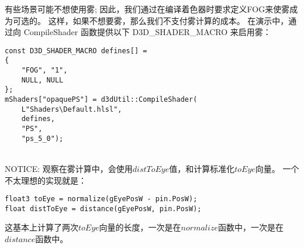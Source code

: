\begin{flushleft}
有些场景可能不想使用雾; 因此，我们通过在编译着色器时要求定义FOG来使雾成为可选的。 这样，如果不想要雾，那么我们不支付雾计算的成本。 在演示中，通过向 CompileShader 函数提供以下 D3D\_SHADER\_MACRO 来启用雾：\\
\end{flushleft}

\begin{lstlisting}
const D3D_SHADER_MACRO defines[] =
{
    "FOG", "1",
    NULL, NULL
};
mShaders["opaquePS"] = d3dUtil::CompileShader(
    L"Shaders\Default.hlsl", 
    defines, 
    "PS", 
    "ps_5_0");
\end{lstlisting}

\begin{flushleft}
~\\
NOTICE: 观察在雾计算中，会使用$distToEye$值，和计算标准化$toEye$向量。 一个不太理想的实现就是：\\
\end{flushleft}

\begin{lstlisting}
float3 toEye = normalize(gEyePosW - pin.PosW);
float distToEye = distance(gEyePosW, pin.PosW);
\end{lstlisting}

\begin{flushleft}
这基本上计算了两次$toEye$向量的长度，一次是在$normalize$函数中，一次是在$distance$函数中。
~\\
\end{flushleft}

